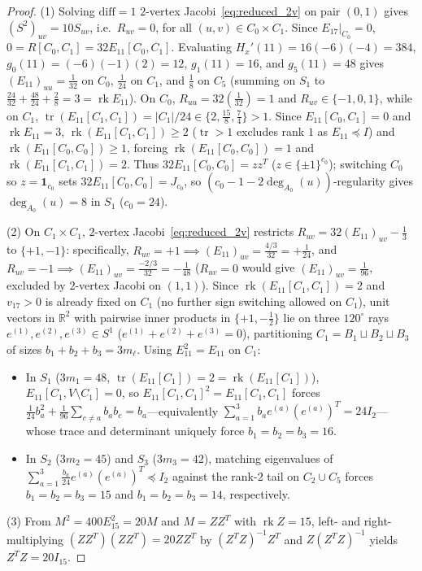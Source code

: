 \documentclass[11pt,reqno]{amsart}
\theoremstyle{definition}
\theoremstyle{remark}
\numberwithin{equation}{section}
\numberwithin{table}{section}
\DeclareMathOperator{\tr}{tr}
\DeclareMathOperator{\rk}{rk}
\begin{document}
\begin{proof}
(1) Solving $\mathrm{diff}=1$ $2$-vertex Jacobi~\eqref{eq:reduced_2v} on pair $(0, 1)$ gives $(S^2)_{uv} = 10 S_{uv}$, i.e.\ $R_{uv} = 0$, for all $(u, v) \in C_0 \times C_1$. Since $E_{17}|_{C_0} = 0$, $0 = R[C_0, C_1] = 32 E_{11}[C_0, C_1]$. Evaluating $H_x'(11) = 16(-6)(-4) = 384$, $g_0(11) = (-6)(-1)(2) = 12$, $g_1(11) = 16$, and $g_5(11) = 48$ gives $(E_{11})_{uu} = \frac{1}{32}$ on $C_0$, $\frac{1}{24}$ on $C_1$, and $\frac{1}{8}$ on $C_5$ (summing on $S_1$ to $\frac{24}{32} + \frac{48}{24} + \frac{2}{8} = 3 = \rk E_{11}$). On $C_0$, $R_{uu} = 32(\frac{1}{32}) = 1$ and $R_{uv} \in \{-1, 0, 1\}$, while on $C_1$, $\tr(E_{11}[C_1, C_1]) = |C_1|/24 \in \{2, \frac{15}{8}, \frac{7}{4}\} > 1$. Since $E_{11}[C_0, C_1] = 0$ and $\rk E_{11} = 3$, $\rk(E_{11}[C_1, C_1]) \ge 2$ ($\tr > 1$ excludes rank $1$ as $E_{11} \preceq I$) and $\rk(E_{11}[C_0, C_0]) \ge 1$, forcing $\rk(E_{11}[C_0, C_0]) = 1$ and $\rk(E_{11}[C_1, C_1]) = 2$. Thus $32 E_{11}[C_0, C_0] = z z^T$ ($z \in \{\pm 1\}^{c_0}$); switching $C_0$ so $z = \mathbf{1}_{c_0}$ sets $32 E_{11}[C_0, C_0] = J_{c_0}$, so $(c_0 - 1 - 2\deg_{A_0}(u))$-regularity gives $\deg_{A_0}(u) = 8$ in $S_1$ ($c_0 = 24$).

(2) On $C_1 \times C_1$, $2$-vertex Jacobi~\eqref{eq:reduced_2v} restricts $R_{uv} = 32(E_{11})_{uv} - \frac{1}{3}$ to $\{+1, -1\}$: specifically, $R_{uv} = +1 \implies (E_{11})_{uv} = \frac{4/3}{32} = +\frac{1}{24}$, and $R_{uv} = -1 \implies (E_{11})_{uv} = \frac{-2/3}{32} = -\frac{1}{48}$ ($R_{uv} = 0$ would give $(E_{11})_{uv} = \frac{1}{96}$, excluded by $2$-vertex Jacobi on $(1,1)$). Since $\rk(E_{11}[C_1, C_1]) = 2$ and $v_{17} > 0$ is already fixed on $C_1$ (no further sign switching allowed on $C_1$), unit vectors in $\mathbb{R}^2$ with pairwise inner products in $\{+1, -\frac{1}{2}\}$ lie on three $120^\circ$ rays $e^{(1)}, e^{(2)}, e^{(3)} \in S^1$ ($e^{(1)} + e^{(2)} + e^{(3)} = 0$), partitioning $C_1 = B_1 \sqcup B_2 \sqcup B_3$ of sizes $b_1 + b_2 + b_3 = 3m_\ell$. Using $E_{11}^2 = E_{11}$ on $C_1$:
\begin{itemize}
  \item In $S_1$ ($3m_1 = 48$, $\tr(E_{11}[C_1]) = 2 = \rk(E_{11}[C_1])$), $E_{11}[C_1, V \setminus C_1] = 0$, so $E_{11}[C_1, C_1]^2 = E_{11}[C_1, C_1]$ forces $\frac{1}{24}b_a^2 + \frac{1}{96}\sum_{c \neq a} b_a b_c = b_a$---equivalently $\sum_{a=1}^3 b_a e^{(a)} (e^{(a)})^T = 24 I_2$---whose trace and determinant uniquely force $b_1 = b_2 = b_3 = 16$.
  \item In $S_2$ ($3m_2 = 45$) and $S_3$ ($3m_3 = 42$), matching eigenvalues of $\sum_{a=1}^3 \frac{b_a}{24} e^{(a)}(e^{(a)})^T \preceq I_2$ against the rank-$2$ tail on $C_2 \cup C_5$ forces $b_1 = b_2 = b_3 = 15$ and $b_1 = b_2 = b_3 = 14$, respectively.
\end{itemize}
(3) From $M^2 = 400 E_{15}^2 = 20 M$ and $M = Z Z^T$ with $\rk Z = 15$, left- and right-multiplying $(Z Z^T)(Z Z^T) = 20 Z Z^T$ by $(Z^T Z)^{-1} Z^T$ and $Z(Z^T Z)^{-1}$ yields $Z^T Z = 20 I_{15}$.
\end{proof}
\end{document}
